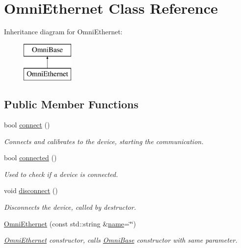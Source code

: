 \hypertarget{classOmniEthernet}{\section{Omni\-Ethernet Class Reference}
\label{classOmniEthernet}
}
Inheritance diagram for Omni\-Ethernet\-:\begin{figure}[H]
\begin{center}
\leavevmode
\includegraphics[height=2.000000cm]{classOmniEthernet}
\end{center}
\end{figure}
\subsection*{Public Member Functions}
\begin{DoxyCompactItemize}
\item 
bool \hyperlink{classOmniEthernet_a2c066f15ef8554fb34ad7901101fa623}{connect} ()
\begin{DoxyCompactList}\small\item\em Connects and calibrates to the device, starting the communication. \end{DoxyCompactList}\item 
bool \hyperlink{classOmniEthernet_aee413137593a3231deeb304537d80d05}{connected} ()
\begin{DoxyCompactList}\small\item\em Used to check if a device is connected. \end{DoxyCompactList}\item 
\hypertarget{classOmniEthernet_aba4911f37396e1b1f09f7e5b28ea105f}{void \hyperlink{classOmniEthernet_aba4911f37396e1b1f09f7e5b28ea105f}{disconnect} ()}\label{classOmniEthernet_aba4911f37396e1b1f09f7e5b28ea105f}

\begin{DoxyCompactList}\small\item\em Disconnects the device, called by destructor. \end{DoxyCompactList}\item 
\hyperlink{classOmniEthernet_a55e6473c599ca47a64d35f9194ad5603}{Omni\-Ethernet} (const std\-::string \&\hyperlink{classOmniBase_a69efd9c11cdef64cbdcf57b52c6539f7}{name}=\char`\"{}\char`\"{})
\begin{DoxyCompactList}\small\item\em \hyperlink{classOmniEthernet}{Omni\-Ethernet} constructor, calls \hyperlink{classOmniBase}{Omni\-Base} constructor with same parameter. \end{DoxyCompactList}\end{DoxyCompactItemize}
